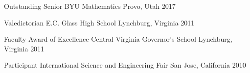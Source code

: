 
\begin{cvhonors}

  \cvhonor
    {Outstanding Senior} %
    {BYU Mathematics} %
    {Provo, Utah} %
    {2017} %

  \cvhonor
    {Valedictorian} %
    {E.C. Glass High School} %
    {Lynchburg, Virginia} %
    {2011} %

  \cvhonor
    {Faculty Award of Excellence} %
    {Central Virginia Governor's School} %
    {Lynchburg, Virginia} %
    {2011} %

  \cvhonor
    {Participant} %
    {International Science and Engineering Fair} %
    {San Jose, California} %
    {2010} %

\end{cvhonors}

